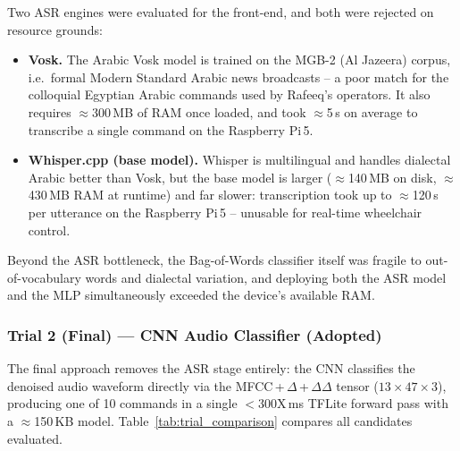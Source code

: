 \documentclass[12pt,a4paper]{report}
\begin{document}
Two ASR engines were evaluated for the front-end, and both were rejected on resource grounds:

\begin{itemize}
  \item \textbf{Vosk.} The Arabic Vosk model is trained on the MGB-2 (Al Jazeera) corpus, i.e.\ formal Modern Standard Arabic news broadcasts -- a poor match for the colloquial Egyptian Arabic commands used by Rafeeq's operators. It also requires $\approx$300\,MB of RAM once loaded, and took $\approx$5\,s on average to transcribe a single command on the Raspberry Pi\,5.
  \item \textbf{Whisper.cpp (base model).} Whisper is multilingual and handles dialectal Arabic better than Vosk, but the base model is larger ($\approx$140\,MB on disk, $\approx$430\,MB RAM at runtime) and far slower: transcription took up to $\approx$120\,s per utterance on the Raspberry Pi\,5 -- unusable for real-time wheelchair control.
\end{itemize}

Beyond the ASR bottleneck, the Bag-of-Words classifier itself was fragile to out-of-vocabulary words and dialectal variation, and deploying both the ASR model and the MLP simultaneously exceeded the device's available RAM.

\subsubsection{Trial 2 (Final) — CNN Audio Classifier (Adopted)}
\label{sec:trial2}

The final approach removes the ASR stage entirely: the CNN classifies the denoised audio waveform directly via the MFCC\,+\,$\Delta$\,+\,$\Delta\Delta$ tensor ($13\times47\times3$), producing one of 10 commands in a single $<$300X\,ms TFLite forward pass with a $\approx$150\,KB model. Table~\ref{tab:trial_comparison} compares all candidates evaluated.
\end{document}
